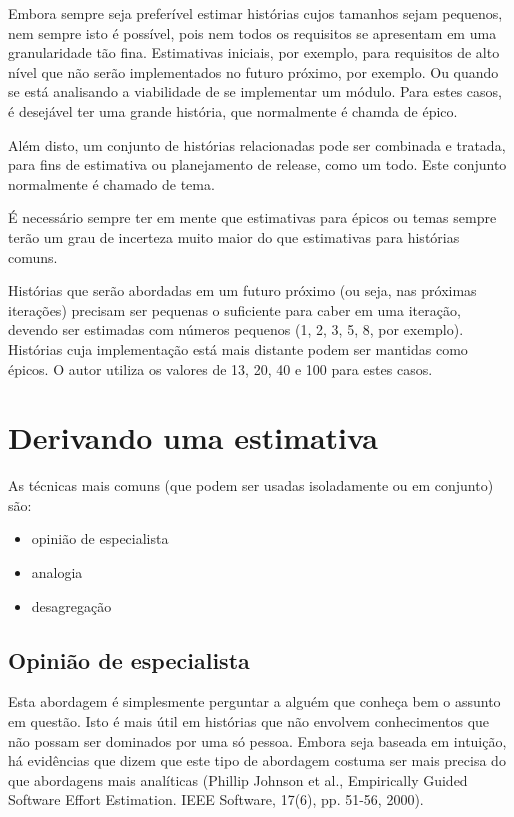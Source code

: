 \documentclass[a4paper,abntfigtabnum,noindentfirst]{abnt}
\begin{document}
Embora sempre seja preferível estimar histórias cujos tamanhos sejam pequenos, nem sempre isto é possível, pois nem todos os requisitos se apresentam em uma granularidade tão fina. Estimativas iniciais, por exemplo, para requisitos de alto nível que não serão implementados no futuro próximo, por exemplo. Ou quando se está analisando a viabilidade de se implementar um módulo. Para estes casos, é desejável ter uma grande história, que normalmente é chamda de épico.

Além disto, um conjunto de histórias relacionadas pode ser combinada e tratada, para fins de estimativa ou planejamento de release, como um todo. Este conjunto normalmente é chamado de tema.

É necessário sempre ter em mente que estimativas para épicos ou temas sempre terão um grau de incerteza muito maior do que estimativas para histórias comuns.

Histórias que serão abordadas em um futuro próximo (ou seja, nas próximas iterações) precisam ser pequenas o suficiente para caber em uma iteração, devendo ser estimadas com números pequenos (1, 2, 3, 5, 8, por exemplo). Histórias cuja implementação está mais distante podem ser mantidas como épicos. O autor utiliza os valores de 13, 20, 40 e 100 para estes casos.


\section{Derivando uma estimativa}

As técnicas mais comuns (que podem ser usadas isoladamente ou em conjunto) são:
\begin{itemize}
\item opinião de especialista
\item analogia
\item desagregação
\end{itemize}

\subsection{Opinião de especialista}

Esta abordagem é simplesmente perguntar a alguém que conheça bem o assunto em questão. Isto é mais útil em histórias que não envolvem conhecimentos que não possam ser dominados por uma só pessoa. Embora seja baseada em intuição, há evidências que dizem que este tipo de abordagem costuma ser mais precisa do que abordagens mais analíticas (Phillip Johnson et al., Empirically Guided Software Effort Estimation. IEEE Software, 17(6), pp. 51-56, 2000).
\end{document}
